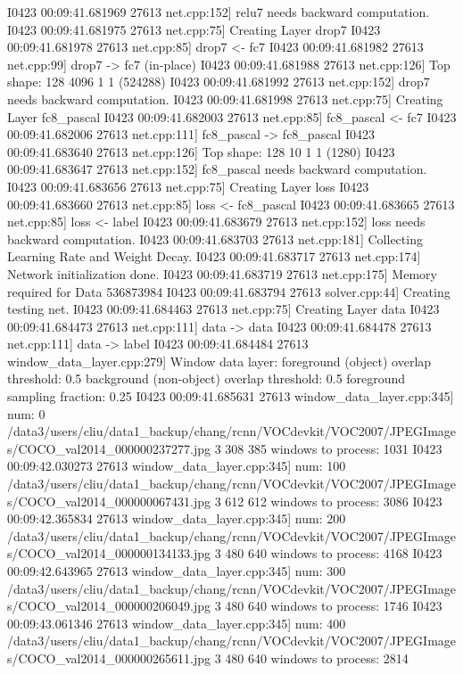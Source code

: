 \documentclass{article}
\begin{document}
I0423 00:09:41.681969 27613 net.cpp:152] relu7 needs backward computation.
I0423 00:09:41.681975 27613 net.cpp:75] Creating Layer drop7
I0423 00:09:41.681978 27613 net.cpp:85] drop7 <- fc7
I0423 00:09:41.681982 27613 net.cpp:99] drop7 -> fc7 (in-place)
I0423 00:09:41.681988 27613 net.cpp:126] Top shape: 128 4096 1 1 (524288)
I0423 00:09:41.681992 27613 net.cpp:152] drop7 needs backward computation.
I0423 00:09:41.681998 27613 net.cpp:75] Creating Layer fc8_pascal
I0423 00:09:41.682003 27613 net.cpp:85] fc8_pascal <- fc7
I0423 00:09:41.682006 27613 net.cpp:111] fc8_pascal -> fc8_pascal
I0423 00:09:41.683640 27613 net.cpp:126] Top shape: 128 10 1 1 (1280)
I0423 00:09:41.683647 27613 net.cpp:152] fc8_pascal needs backward computation.
I0423 00:09:41.683656 27613 net.cpp:75] Creating Layer loss
I0423 00:09:41.683660 27613 net.cpp:85] loss <- fc8_pascal
I0423 00:09:41.683665 27613 net.cpp:85] loss <- label
I0423 00:09:41.683679 27613 net.cpp:152] loss needs backward computation.
I0423 00:09:41.683703 27613 net.cpp:181] Collecting Learning Rate and Weight Decay.
I0423 00:09:41.683717 27613 net.cpp:174] Network initialization done.
I0423 00:09:41.683719 27613 net.cpp:175] Memory required for Data 536873984
I0423 00:09:41.683794 27613 solver.cpp:44] Creating testing net.
I0423 00:09:41.684463 27613 net.cpp:75] Creating Layer data
I0423 00:09:41.684473 27613 net.cpp:111] data -> data
I0423 00:09:41.684478 27613 net.cpp:111] data -> label
I0423 00:09:41.684484 27613 window_data_layer.cpp:279] Window data layer:
  foreground (object) overlap threshold: 0.5
  background (non-object) overlap threshold: 0.5
  foreground sampling fraction: 0.25
I0423 00:09:41.685631 27613 window_data_layer.cpp:345] num: 0 /data3/users/cliu/data1_backup/chang/rcnn/VOCdevkit/VOC2007/JPEGImages/COCO_val2014_000000237277.jpg 3 308 385 windows to process: 1031
I0423 00:09:42.030273 27613 window_data_layer.cpp:345] num: 100 /data3/users/cliu/data1_backup/chang/rcnn/VOCdevkit/VOC2007/JPEGImages/COCO_val2014_000000067431.jpg 3 612 612 windows to process: 3086
I0423 00:09:42.365834 27613 window_data_layer.cpp:345] num: 200 /data3/users/cliu/data1_backup/chang/rcnn/VOCdevkit/VOC2007/JPEGImages/COCO_val2014_000000134133.jpg 3 480 640 windows to process: 4168
I0423 00:09:42.643965 27613 window_data_layer.cpp:345] num: 300 /data3/users/cliu/data1_backup/chang/rcnn/VOCdevkit/VOC2007/JPEGImages/COCO_val2014_000000206049.jpg 3 480 640 windows to process: 1746
I0423 00:09:43.061346 27613 window_data_layer.cpp:345] num: 400 /data3/users/cliu/data1_backup/chang/rcnn/VOCdevkit/VOC2007/JPEGImages/COCO_val2014_000000265611.jpg 3 480 640 windows to process: 2814
\end{document}
